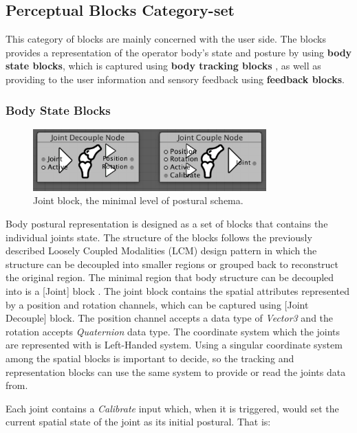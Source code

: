 \subsection{Perceptual Blocks Category-set}

This category of blocks are mainly concerned with the user side. The blocks provides a representation of the operator body's state and posture by using \textbf{body state blocks}, which is captured using \textbf{body tracking blocks} , as well as providing to the user information and sensory feedback using  \textbf{feedback blocks}.

\subsubsection{Body State Blocks}

\begin{figure}[b!]
\centering
\captionsetup{justification=centering} 
\includegraphics[width=0.8\textwidth]{figures/system/Blocks/Joint.png}
\caption{Joint block, the minimal level of postural schema.}
  \label{fig:system-blocks-joint}
\end{figure}
Body postural representation is designed as a set of blocks that contains the individual joints state. The structure of the blocks follows the previously described Loosely Coupled Modalities (LCM) design pattern in which the structure can be decoupled into smaller regions or grouped back to reconstruct the original region. The minimal region that body structure can be decoupled into is a [Joint] block . The joint block contains the spatial attributes represented by a position and rotation channels, which can be captured using [Joint Decouple] block. The position channel accepts a data type of \textit{Vector3} and the rotation accepts \textit{Quaternion} data type. The coordinate system which the joints are represented with is Left-Handed system. Using a singular coordinate system among the spatial blocks is important to decide, so the tracking and representation blocks can use the same system to provide or read the joints data from.

Each joint contains a \textit{Calibrate} input which, when it is triggered, would set the current spatial state of the joint as its initial postural. That is:

